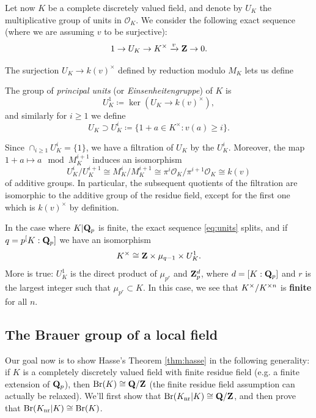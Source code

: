 \documentclass{article}
\begin{document}
Let now $K$ be a complete discretely valued field, and denote by $U_K$ the multiplicative group of units in $\mathcal{O}_K$. We consider the following exact sequence (where we are assuming $v$ to be surjective):
\begin{equation}\label{eq:units}
		1 \to U_K \to K^\times \xrightarrow{v} \mathbf{Z} \to 0.
\end{equation}

The surjection $U_K\to k(v)^\times$ defined by reduction modulo $M_K$ lets us define
\begin{defn}
		The group of \emph{principal units} (or \emph{Einsenheitengruppe}) of $K$ is
		\[
			U_K^1 \coloneqq \ker(U_K\to k(v)^\times), \]
			and similarly for $i\ge 1$ we define
			\[
			U_K \supset U_K^i \coloneqq \{1+a\in K^\times: v(a)\ge i\}.
		\]
\end{defn}
Since $\cap_{i\ge 1} U_K^i = \{1\}$, we have a filtration of $U_K$ by the $U_K^i$. Moreover, the map $1+a\mapsto a \mod M_K^{i+1}$ induces an isomorphism
\[
	U_K^i/U_K^{i+1} \cong M_K^i/M_K^{i+1} \cong \pi^i\mathcal{O}_K/\pi^{i+1}\mathcal{O}_K \cong k(v)
\]
of additive groups. In particular, the subsequent quotients of the filtration are isomorphic to the additive group of the residue field, except for the first one which is $k(v)^\times$ by definition.

In the case where $K|\mathbf{Q}_p$ is finite, the exact sequence \eqref{eq:units} splits, and if $q=p^[K:\mathbf{Q}_p]$ we have an isomorphism
\[
	K^\times \cong \mathbf{Z} \times \mu_{q-1} \times U_K^1.
\]
More is true: $U_K^1$ is the direct product of $\mu_{p^r}$ and $\mathbf{Z}_p^d$, where $d=[K:\mathbf{Q}_p]$ and $r$ is the largest integer such that $\mu_{p^r}\subset K$. In this case, we see that $K^\times / K^{\times n}$ is \textbf{finite} for all $n$.

\subsection{The Brauer group of a local field}
Our goal now is to show Hasse's Theorem \ref{thm:hasse} in the following generality: if $K$ is a completely discretely valued field with finite residue field (e.g. a finite extension of $\mathbf{Q}_p$), then $\text{Br}(K)\cong \mathbf{Q}/\mathbf{Z}$ (the finite residue field assumption can actually be relaxed). We'll first show that $\text{Br}(K_\text{nr}|K)\cong \mathbf{Q}/\mathbf{Z}$, and then prove that $\text{Br}(K_\text{nr}|K)\cong \text{Br}(K)$.
\end{document}
